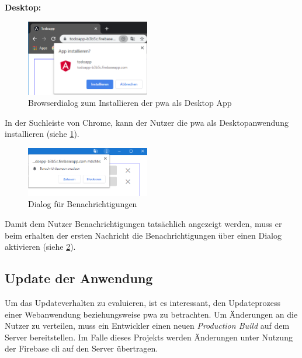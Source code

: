 \textbf{Desktop:}
\begin{figure}
	\vspace{-10pt}
	\includegraphics[width=0.48\textwidth]{img/add_to_desktop_2.PNG}
	\caption{Browserdialog zum Installieren der \ac{pwa} als Desktop App}
	\label{fig:dialog_install_pwa_desktop}
	\vspace{-10pt}
\end{figure}
In der Suchleiste von Chrome, kann der Nutzer die \ac{pwa} als Desktopanwendung installieren (siehe \ref{fig:dialog_install_pwa_desktop}).
\begin{figure}
	\vspace{-10pt}
	\includegraphics[width=0.48\textwidth]{img/berechtigungen_zulassen.PNG}
	\centering
	\caption{Dialog für Benachrichtigungen}
	\label{fig:pwa_benachrichtigungen_zulassen}
	\vspace{-10pt}
\end{figure}
Damit dem Nutzer Benachrichtigungen tatsächlich angezeigt werden, muss er beim erhalten der ersten Nachricht die Benachrichtigungen über einen Dialog aktivieren (siehe \ref{fig:pwa_benachrichtigungen_zulassen}).

\subsection{Update der Anwendung}

Um das Updateverhalten zu evaluieren, ist es interessant, den Updateprozess einer Webanwendung beziehungsweise \ac{pwa} zu betrachten. Um Änderungen an die Nutzer zu verteilen, muss ein Entwickler einen neuen \textit{Production Build} auf dem Server bereitstellen. Im Falle dieses Projekts werden Änderungen unter Nutzung der Firebase \ac{cli} auf den Server übertragen.

